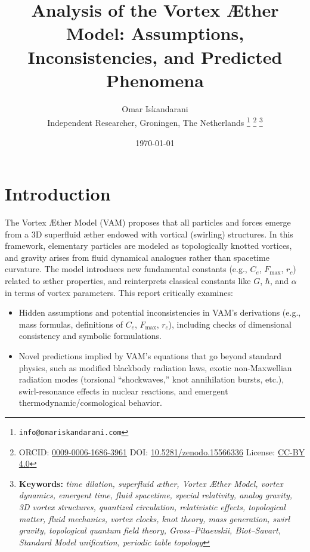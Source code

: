 \documentclass[a4paper,12pt]{article}
\begin{document}
    \title{Analysis of the Vortex Æther Model: Assumptions, Inconsistencies, and Predicted Phenomena}
    \date{\today}
    \author{
        Omar Iskandarani\\
        \small Independent Researcher, Groningen, The Netherlands
        \thanks{\texttt{info@omariskandarani.com}}
        \thanks{ORCID: \href{https://orcid.org/0009-0006-1686-3961}{0009-0006-1686-3961} \quad DOI: \href{https://doi.org/10.5281/zenodo.15566336}{10.5281/zenodo.15566336} \quad License: \href{https://creativecommons.org/licenses/by/4.0/}{CC-BY 4.0}}
        \noindent\thanks{\textbf{Keywords:} \textit{time dilation, superfluid æther, Vortex Æther Model, vortex dynamics, emergent time, fluid spacetime, special relativity, analog gravity, 3D vortex structures, quantized circulation, relativistic effects, topological matter, fluid mechanics, vortex clocks, knot theory, mass generation, swirl gravity, topological quantum field theory, Gross--Pitaevskii, Biot--Savart, Standard Model unification, periodic table topology}}
    }
    \maketitle
\section*{Introduction}

    The Vortex Æther Model (VAM) proposes that all particles and forces emerge from a 3D superfluid æther endowed with vortical (swirling) structures. In this framework, elementary particles are modeled as topologically knotted vortices, and gravity arises from fluid dynamical analogues rather than spacetime curvature. The model introduces new fundamental constants (e.g., $C_e$, $F_{\max}$, $r_c$) related to æther properties, and reinterprets classical constants like $G$, $\hbar$, and $\alpha$ in terms of vortex parameters. This report critically examines:

\begin{itemize}
        \item Hidden assumptions and potential inconsistencies in VAM’s derivations (e.g., mass formulas, definitions of $C_e$, $F_{\max}$, $r_c$), including checks of dimensional consistency and symbolic formulations.
        \item Novel predictions implied by VAM’s equations that go beyond standard physics, such as modified blackbody radiation laws, exotic non-Maxwellian radiation modes (torsional ``shockwaves,'' knot annihilation bursts, etc.), swirl-resonance effects in nuclear reactions, and emergent thermodynamic/cosmological behavior.
\end{itemize}
\end{document}
